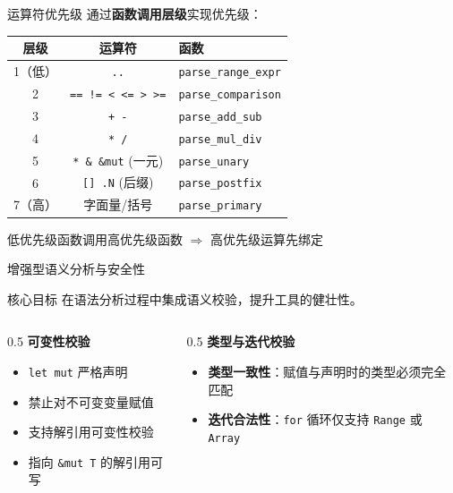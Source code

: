 \documentclass[aspectratio=169]{ctexbeamer}
\begin{document}
\begin{frame}{运算符优先级}
    通过\textbf{函数调用层级}实现优先级：
    \begin{table}
    \centering
    \begin{tabular}{ccl}
    \toprule
    \textbf{层级} & \textbf{运算符} & \textbf{函数} \\
    \midrule
    1（低） & \texttt{..} & \texttt{parse\_range\_expr} \\
    2 & \texttt{== != < <= > >=} & \texttt{parse\_comparison} \\
    3 & \texttt{+ -} & \texttt{parse\_add\_sub} \\
    4 & \texttt{* /} & \texttt{parse\_mul\_div} \\
    5 & \texttt{* \& \&mut} (一元) & \texttt{parse\_unary} \\
    6 & \texttt{[] .N} (后缀) & \texttt{parse\_postfix} \\
    7（高） & 字面量/括号 & \texttt{parse\_primary} \\
    \bottomrule
    \end{tabular}
    \end{table}
    \vfill
    低优先级函数调用高优先级函数 $\Rightarrow$ 高优先级运算先绑定
\end{frame}

\begin{frame}{增强型语义分析与安全性}
    \begin{block}{核心目标}
        在语法分析过程中集成语义校验，提升工具的健壮性。
    \end{block}
    \vfill
    \begin{columns}[T]
    \begin{column}{0.5\textwidth}
        \textbf{可变性校验}
        \begin{itemize}
            \item \texttt{let mut} 严格声明
            \item 禁止对不可变变量赋值
            \item 支持解引用可变性校验
            \item 指向 \texttt{\&mut T} 的解引用可写
        \end{itemize}
    \end{column}
    \begin{column}{0.5\textwidth}
        \textbf{类型与迭代校验}
        \begin{itemize}
            \item \textbf{类型一致性}：赋值与声明时的类型必须完全匹配
            \item \textbf{迭代合法性}：\texttt{for} 循环仅支持 \texttt{Range} 或 \texttt{Array}
        \end{itemize}
    \end{column}
    \end{columns}
\end{frame}
\end{document}
